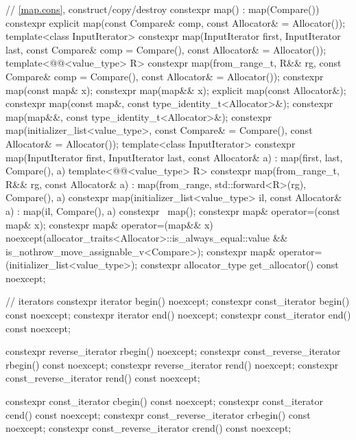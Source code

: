 \begin{codeblock}
{{    // \ref{map.cons}, construct/copy/destroy
    constexpr map() : map(Compare()) { }
    constexpr explicit map(const Compare& comp, const Allocator& = Allocator());
    template<class InputIterator>
      constexpr map(InputIterator first, InputIterator last,
                    const Compare& comp = Compare(), const Allocator& = Allocator());
    template<@@<value_type> R>
      constexpr map(from_range_t, R&& rg, const Compare& comp = Compare(),
                    const Allocator& = Allocator());
    constexpr map(const map& x);
    constexpr map(map&& x);
    explicit map(const Allocator&);
    constexpr map(const map&, const type_identity_t<Allocator>&);
    constexpr map(map&&, const type_identity_t<Allocator>&);
    constexpr map(initializer_list<value_type>, const Compare& = Compare(),
                  const Allocator& = Allocator());
    template<class InputIterator>
      constexpr map(InputIterator first, InputIterator last, const Allocator& a)
        : map(first, last, Compare(), a) { }
    template<@@<value_type> R>
      constexpr map(from_range_t, R&& rg, const Allocator& a)
        : map(from_range, std::forward<R>(rg), Compare(), a) { }
    constexpr map(initializer_list<value_type> il, const Allocator& a)
      : map(il, Compare(), a) { }
    constexpr ~map();
    constexpr map& operator=(const map& x);
    constexpr map& operator=(map&& x)
      noexcept(allocator_traits<Allocator>::is_always_equal::value &&
               is_nothrow_move_assignable_v<Compare>);
    constexpr map& operator=(initializer_list<value_type>);
    constexpr allocator_type get_allocator() const noexcept;

    // iterators
    constexpr iterator               begin() noexcept;
    constexpr const_iterator         begin() const noexcept;
    constexpr iterator               end() noexcept;
    constexpr const_iterator         end() const noexcept;

    constexpr reverse_iterator       rbegin() noexcept;
    constexpr const_reverse_iterator rbegin() const noexcept;
    constexpr reverse_iterator       rend() noexcept;
    constexpr const_reverse_iterator rend() const noexcept;

    constexpr const_iterator         cbegin() const noexcept;
    constexpr const_iterator         cend() const noexcept;
    constexpr const_reverse_iterator crbegin() const noexcept;
    constexpr const_reverse_iterator crend() const noexcept;

}}
\end{codeblock}
